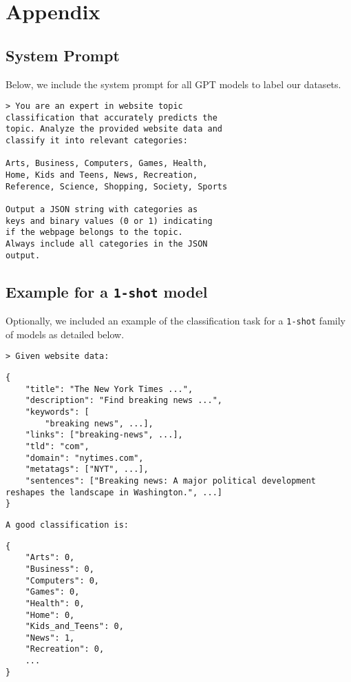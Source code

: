 \section{Appendix}

\subsection{System Prompt}\label{app:system-prompt}
Below, we include the system prompt for all GPT models to label our datasets.

\begin{verbatim}
> You are an expert in website topic 
classification that accurately predicts the 
topic. Analyze the provided website data and 
classify it into relevant categories:

Arts, Business, Computers, Games, Health, 
Home, Kids and Teens, News, Recreation, 
Reference, Science, Shopping, Society, Sports

Output a JSON string with categories as
keys and binary values (0 or 1) indicating 
if the webpage belongs to the topic. 
Always include all categories in the JSON 
output.
\end{verbatim}

\subsection{Example for a \texttt{1-shot} model}\label{app:example-1-shot}
Optionally, we included an example of the classification task for a \texttt{1-shot} family
of models as detailed below.

\begin{verbatim}
> Given website data:
\end{verbatim}

\begin{lstlisting}
{         
    "title": "The New York Times ...",
    "description": "Find breaking news ...",
    "keywords": [
        "breaking news", ...],
    "links": ["breaking-news", ...],
    "tld": "com",
    "domain": "nytimes.com",
    "metatags": ["NYT", ...],
    "sentences": ["Breaking news: A major political development reshapes the landscape in Washington.", ...]
}
\end{lstlisting}

\begin{verbatim}
A good classification is:
\end{verbatim}

\begin{lstlisting}
{
    "Arts": 0,
    "Business": 0,
    "Computers": 0,
    "Games": 0,
    "Health": 0,
    "Home": 0,
    "Kids_and_Teens": 0,
    "News": 1,
    "Recreation": 0,
    ...
}
\end{lstlisting}


